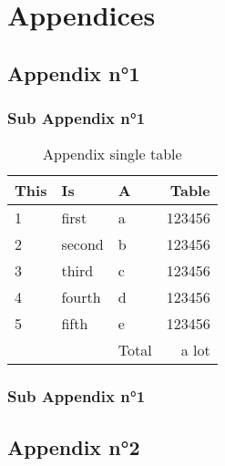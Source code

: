 \blankpage

\chapter*{Appendices}

\makeatletter
\renewcommand\listoftables{%
    \@starttoc{lot}%
}
\makeatother


\renewcommand{\thesection}{\Alph{section}}

\setcounter{section}{0}
\setcounter{figure}{0}
\setcounter{table}{0}
\captionsetup[figure]{list=no}
\captionsetup[table]{list=no}
\captionsetup{labelformat=AppendixTables}

\section{Appendix n°1}

\lipsum[1-2]

\subsection{Sub Appendix n°1}

\begin{table}[htb]
  \caption{Appendix single table}
  \label{tab:appendix-simple-table}
  \centering
  \footnotesize

  \begin{tabular}{lll | r}
      \toprule
      This & Is & A & Table\\
      \midrule
      1 & first     & a & 123456\\
      2 & second    & b & 123456\\
      3 & third     & c & 123456\\
      4 & fourth    & d & 123456\\
      5 & fifth     & e & 123456\\
      \bottomrule
        &           & Total & a lot\\
      \bottomrule
  \end{tabular}
\end{table}

\lipsum[58]


\subsection{Sub Appendix n°1}

\lipsum[12]

\section{Appendix n°2}

\lipsum[1-2]